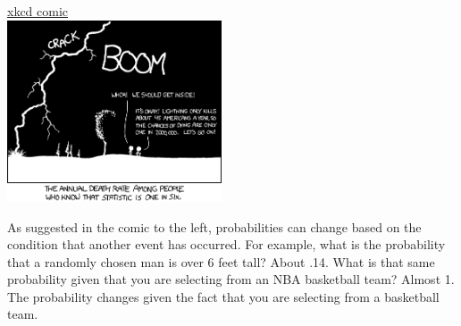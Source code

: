 \documentclass[11pt]{article}
\begin{document}
\begin{minipage}{.475\textwidth}
\href{bayes_figs/https://imgs.xkcd.com/comics/conditional_risk.png}{xkcd comic}\\
\includegraphics[width = 2.5in]{bayes_figs/conditional_risk.png}
\end{minipage}
\hfill
\begin{minipage}{.5\textwidth}
As suggested in the comic to the left, probabilities can change based on the condition that another event has occurred. For example, what is the probability that a randomly chosen man is over 6 feet tall? About .14. What is that same probability given that you are selecting from an NBA basketball team? Almost 1. The probability changes given the fact that you are selecting from a basketball team.
\end{minipage}
%
%
%
\end{document}

